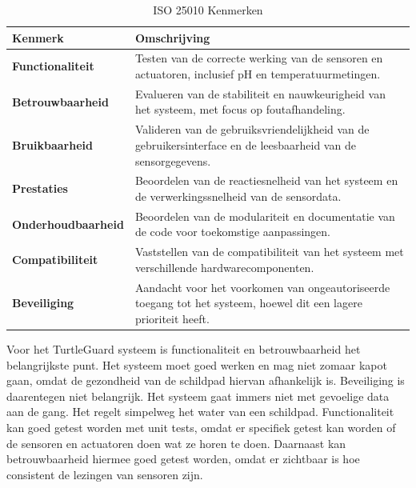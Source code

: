 \documentclass[a4paper]{report}
\newcommand{\turtleguard}{\mbox{TurtleGuard\texttrademark}\xspace}
\begin{document}
\begin{table}[H]
  \centering
  \begin{tabularx}{\textwidth}{|l|X|}
    \hline
    \textbf{Kenmerk} & \textbf{Omschrijving} \\
    \hline 
    \textbf{Functionaliteit} & Testen van de correcte werking van de sensoren en actuatoren, inclusief pH en temperatuurmetingen. \\ 
    \hline
    \textbf{Betrouwbaarheid} & Evalueren van de stabiliteit en nauwkeurigheid van het systeem, met focus op foutafhandeling. \\ 
    \hline
    \textbf{Bruikbaarheid} & Valideren van de gebruiksvriendelijkheid van de gebruikersinterface en de leesbaarheid van de sensorgegevens. \\ 
    \hline
    \textbf{Prestaties} & Beoordelen van de reactiesnelheid van het systeem en de verwerkingssnelheid van de sensordata. \\
    \hline
    \textbf{Onderhoudbaarheid} & Beoordelen van de modulariteit en documentatie van de code voor toekomstige aanpassingen. \\
    \hline
    \textbf{Compatibiliteit} & Vaststellen van de compatibiliteit van het systeem met verschillende hardwarecomponenten. \\
    \hline
    \textbf{Beveiliging} & Aandacht voor het voorkomen van ongeautoriseerde toegang tot het systeem, hoewel dit een lagere prioriteit heeft. \\
    \hline
  \end{tabularx}
  \caption{ISO 25010 Kenmerken}
  \label{tab:25010_specs}
\end{table}


Voor het \turtleguard systeem is functionaliteit en betrouwbaarheid het belangrijkste punt. 
Het systeem moet goed werken en mag niet zomaar kapot gaan, omdat de gezondheid van de schildpad hiervan afhankelijk is.
Beveiliging is daarentegen niet belangrijk. Het systeem gaat immers niet met gevoelige data aan de gang. Het regelt simpelweg het water van een schildpad.
Functionaliteit kan goed getest worden met unit tests, omdat er specifiek getest kan worden of de sensoren en actuatoren doen wat ze horen te doen. 
Daarnaast kan betrouwbaarheid hiermee goed getest worden, omdat er zichtbaar is hoe consistent de lezingen van sensoren zijn. 
\end{document}
